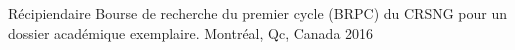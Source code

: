 \begin{cvhonors}
  \cvhonor
    {R\'ecipiendaire}
    {Bourse de recherche du premier cycle (BRPC) du CRSNG pour un dossier acad\'emique exemplaire.}
    {Montr\'eal, Qc, Canada}
    {2016}

\end{cvhonors}
